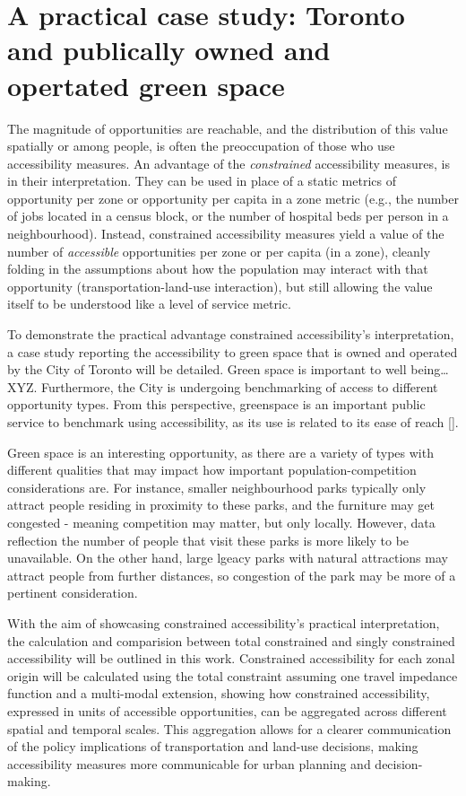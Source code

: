 \documentclass[
11pt, %
oneside, %
english, %
singlespacing, %
]{macthesis} %
\begin{document}
\section{A practical case study: Toronto and publically owned and opertated green space}\label{a-practical-case-study-toronto-and-publically-owned-and-opertated-green-space}

The magnitude of opportunities are reachable, and the distribution of this value spatially or among people, is often the preoccupation of those who use accessibility measures. An advantage of the \emph{constrained} accessibility measures, is in their interpretation. They can be used in place of a static metrics of opportunity per zone or opportunity per capita in a zone metric (e.g., the number of jobs located in a census block, or the number of hospital beds per person in a neighbourhood). Instead, constrained accessibility measures yield a value of the number of \emph{accessible} opportunities per zone or per capita (in a zone), cleanly folding in the assumptions about how the population may interact with that opportunity (transportation-land-use interaction), but still allowing the value itself to be understood like a level of service metric.

To demonstrate the practical advantage constrained accessibility's interpretation, a case study reporting the accessibility to green space that is owned and operated by the City of Toronto will be detailed. Green space is important to well being\ldots{} XYZ. Furthermore, the City is undergoing benchmarking of access to different opportunity types. From this perspective, greenspace is an important public service to benchmark using accessibility, as its use is related to its ease of reach {[}{]}.

Green space is an interesting opportunity, as there are a variety of types with different qualities that may impact how important population-competition considerations are. For instance, smaller neighbourhood parks typically only attract people residing in proximity to these parks, and the furniture may get congested - meaning competition may matter, but only locally. However, data reflection the number of people that visit these parks is more likely to be unavailable. On the other hand, large lgeacy parks with natural attractions may attract people from further distances, so congestion of the park may be more of a pertinent consideration.

With the aim of showcasing constrained accessibility's practical interpretation, the calculation and comparision between total constrained and singly constrained accessibility will be outlined in this work. Constrained accessibility for each zonal origin will be calculated using the total constraint assuming one travel impedance function and a multi-modal extension, showing how constrained accessibility, expressed in units of accessible opportunities, can be aggregated across different spatial and temporal scales. This aggregation allows for a clearer communication of the policy implications of transportation and land-use decisions, making accessibility measures more communicable for urban planning and decision-making.
\end{document}
